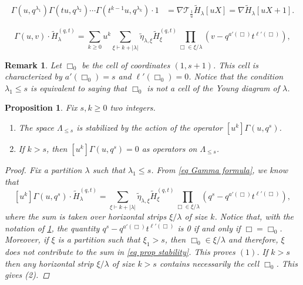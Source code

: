 \documentclass[10pt,a4paper]{amsart}
\newtheorem{rmq}{Remark}
\newtheorem{prop}{Proposition}
\newcommand{\Top}{\mathcal{T}}
\newcommand{\tH}{\widetilde{H}^{(q,t)}}
\begin{document}
	\begin{align}\label{eq creation modified 2}
\Gamma(u,q^{\lambda_1})\Gamma(tu,q^{\lambda_2})\cdots \Gamma(t^{k-1}u,q^{\lambda_{k}})\cdot 1 & =\nabla \Top_{\frac{1}{u}} \widetilde{H}_\lambda[uX]=\nabla \widetilde{H}_\lambda[uX+1].
	\end{align}

\begin{equation}\label{eq Gamma formula}
  \Gamma(u,v)\cdot \tH_\lambda=\sum_{k\geq 0}u^k\sum_{\xi\vdash k+|\lambda|}\widetilde\eta_{\lambda,\xi}\tH_\xi\prod_{\Box\in\xi/ \lambda}\left(v-q^{a'(\Box)}t^{\ell'(\Box)}\right),  
\end{equation}

\begin{rmq}\label{rmq Box0}
    Let $\Box_0$ be the cell of coordinates $(1,s+1)$. This cell is characterized by $a'(\Box_0)=s$ and $\ell'(\Box_0)=0$. Notice that the condition $\lambda_1\leq s$ is equivalent to saying that $\Box_0$ is not a cell of the Young diagram of $\lambda$.
\end{rmq}

\begin{prop}\label{prop stability and vhanishing condition}
    Fix $s,k\geq 0$ two integers. 
    \begin{enumerate}[label={\normalfont(}\arabic*\normalfont)]
        \item The space $\Lambda_{\leq s}$ is stabilized by the action of the operator $[u^k]\Gamma(u,q^s)$.
        \item If $k>s$, then $[u^k]\Gamma(u,q^s)=0$ as operators on $\Lambda_{\leq s}$. 
    \end{enumerate} 
\begin{proof}
Fix a partition $\lambda$ such that $\lambda_1\leq s$.
From \cref{eq Gamma formula}, we know that 
\begin{equation}\label{eq prop stability}
  [u^k]\Gamma(u,q^s)\cdot \tH_\lambda=\sum_{\xi\vdash k+|\lambda|}\widetilde\eta_{\lambda,\xi}\tH_\xi\prod_{\Box\in\xi/ \lambda}\left(q^s-q^{a'(\Box)}t^{\ell'(\Box)}\right),  
\end{equation}
where the sum is taken over horizontal strips $\xi/\lambda$ of size $k$. Notice that, with the notation of \cref{rmq Box0}, the quantity $q^s-q^{a'(\Box)}t^{\ell'(\Box)}$ is 0 if and only if $\Box=\Box_0$. Moreover, if $\xi$ is a partition such that $\xi_1>s$, then $\Box_0\in\xi/\lambda$ and therefore, $\xi$ does not contribute to the sum in \cref{eq prop stability}. This proves $(1)$. If $k>s$ then any horizontal strip $\xi/\lambda$ of size $k>s$ contains necessarily the cell $\Box_0$. This gives (2).    
\end{proof}
\end{prop}
\end{document}
